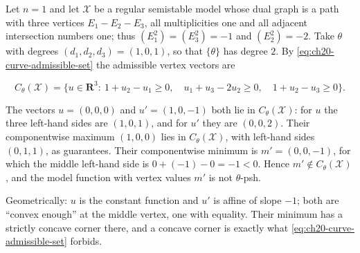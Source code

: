 \begin{example}
\label{ex:ch20-min-fails}
Let \(n=1\) and let \(\mathcal X\) be a regular semistable model whose dual
graph is a path with three vertices \(E_1-E_2-E_3\), all multiplicities one
and all adjacent intersection numbers one; thus \((E_1^2)=(E_3^2)=-1\) and
\((E_2^2)=-2\).  Take \(\theta\) with degrees \((d_1,d_2,d_3)=(1,0,1)\), so
that \(\{\theta\}\) has degree \(2\).  By
\eqref{eq:ch20-curve-admissible-set} the admissible vertex vectors are

\[
 C_\theta(\mathcal X)=
 \bigl\{u\in\mathbf R^3:\ 1+u_2-u_1\geq0,\quad
   u_1+u_3-2u_2\geq0,\quad 1+u_2-u_3\geq0\bigr\}.
\]

The vectors \(u=(0,0,0)\) and \(u'=(1,0,-1)\) both lie in
\(C_\theta(\mathcal X)\): for \(u\) the three left-hand sides are
\((1,0,1)\), and for \(u'\) they are \((0,0,2)\).  Their componentwise
maximum \((1,0,0)\) lies in \(C_\theta(\mathcal X)\), with left-hand sides
\((0,1,1)\), as  guarantees.  Their
componentwise minimum is \(m'=(0,0,-1)\), for which the middle left-hand
side is \(0+(-1)-0=-1<0\).  Hence \(m'\notin C_\theta(\mathcal X)\), and the
model function with vertex values \(m'\) is not \(\theta\)-psh.

Geometrically: \(u\) is the constant function and \(u'\) is affine of slope
\(-1\); both are ``convex enough'' at the middle vertex, one with equality.
Their minimum has a strictly concave corner there, and a concave corner is
exactly what \eqref{eq:ch20-curve-admissible-set} forbids.
\end{example}

